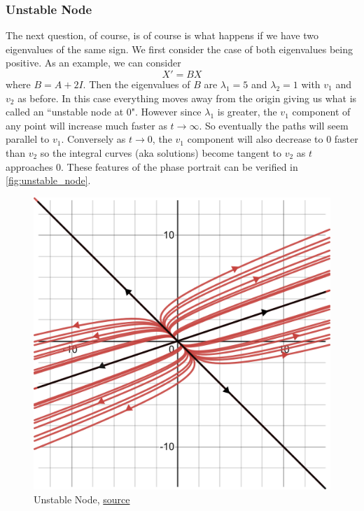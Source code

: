 \subsubsection{Unstable Node}
The next question, of course, is of course is what happens if we have two eigenvalues of the same sign. We first consider the case of both eigenvalues being positive. As an example, we can consider
\begin{equation}
    X' = BX
\end{equation}
where $B = A + 2I$. Then the eigenvalues of $B$ are $\lambda_1 = 5$ and $\lambda_2 = 1$ with $v_1$ and $v_2$ as before. In this case everything moves away from the origin giving us what is called an ``unstable node at 0". However since $\lambda_1$ is greater, the $v_1$ component of any point will increase much faster as $t \to \infty$. So eventually the paths will seem parallel to $v_1$. Conversely as $t \to 0$, the $v_1$ component will also decrease to 0 faster than $v_2$ so the integral curves (aka solutions) become tangent to $v_2$ as $t$ approaches 0. These features of the phase portrait can be verified in \autoref{fig:unstable_node}.

\begin{figure}[ht]
    \centering
    \includegraphics[scale=0.35]{Images/unstable_node.png}
    \caption{Unstable Node, \href{https://www.desmos.com/calculator/icgyjpqmjx}{source}}
    \label{fig:unstable_node}
\end{figure}

